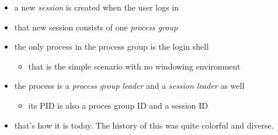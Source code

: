 \begin{itemize}
\item a new \emph{session} is created when the user logs in
\item that new session consists of one \emph{process group}
\item the only process in the process group is the login shell
\begin{itemize}
	\item that is the simple scenario with no windowing environment
\end{itemize}
\item the process is a \emph{process group leader} and a \emph{session leader}
as well
\begin{itemize}
	\item its PID is also a proces group ID and a session ID
\end{itemize}
\item that's how it is today. The history of this was quite colorful and
diverse.
\end{itemize}

